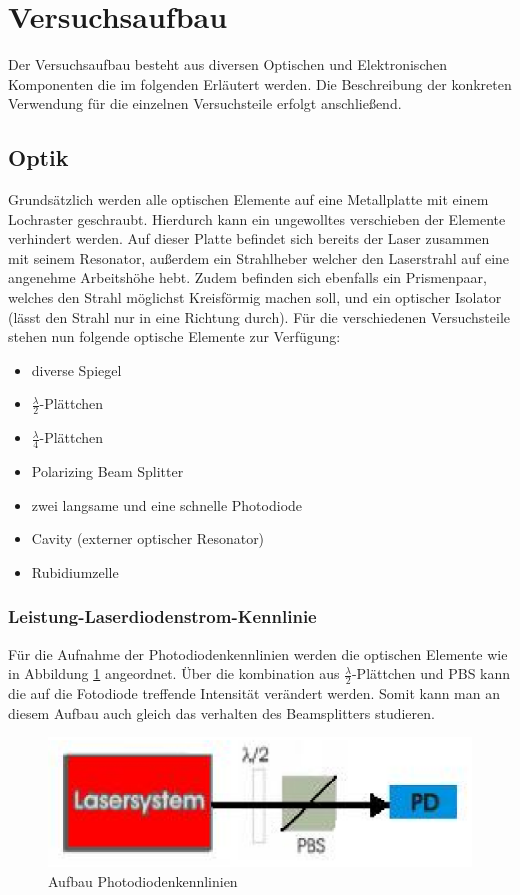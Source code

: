 \documentclass[12pt]{article}
\begin{document}
\section{Versuchsaufbau}
Der Versuchsaufbau besteht aus diversen Optischen und Elektronischen Komponenten die im folgenden Erläutert werden.
Die Beschreibung der konkreten Verwendung für die einzelnen Versuchsteile erfolgt anschließend.
\subsection{Optik}
Grundsätzlich werden alle optischen Elemente auf eine Metallplatte mit einem Lochraster geschraubt. Hierdurch kann ein ungewolltes verschieben der Elemente verhindert werden. Auf dieser Platte befindet sich bereits der Laser zusammen mit seinem Resonator, außerdem ein Strahlheber welcher den Laserstrahl auf eine angenehme Arbeitshöhe hebt. Zudem befinden sich ebenfalls ein Prismenpaar, welches den Strahl möglichst Kreisförmig machen soll, und ein optischer Isolator (lässt den Strahl nur in eine Richtung durch). Für die verschiedenen Versuchsteile stehen nun folgende optische Elemente zur Verfügung:
\begin{itemize}
 \item diverse Spiegel
 \item $\frac{\lambda}{2}$-Plättchen
 \item $\frac{\lambda}{4}$-Plättchen
 \item Polarizing Beam Splitter
 \item zwei langsame und eine schnelle Photodiode
 \item Cavity (externer optischer Resonator)
 \item Rubidiumzelle
\end{itemize}
\newpage 
\subsubsection{Leistung-Laserdiodenstrom-Kennlinie}
Für die Aufnahme der Photodiodenkennlinien werden die optischen Elemente wie in Abbildung \ref{skizze-pd} angeordnet.
Über die kombination aus $\frac{\lambda}{2}$-Plättchen und PBS kann die auf die Fotodiode treffende Intensität verändert werden. Somit kann man an diesem Aufbau auch gleich das verhalten des Beamsplitters studieren.
\begin{figure}[H]
 \includegraphics[width=0.9\linewidth]{pictures/eichung_der_photodiode.eps}
 \caption{Aufbau Photodiodenkennlinien}
 \label{skizze-pd}
\end{figure}
\newpage
\end{document}
